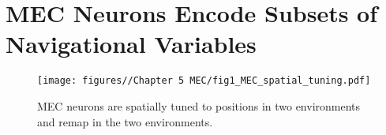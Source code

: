 \chapter{MEC Neurons Encode Subsets of Navigational Variables}
\label{chapterlabel5}

\begin{figure}
    \centering
    \texttt{[image: figures//Chapter 5 MEC/fig1\_MEC\_spatial\_tuning.pdf]}
    \caption{MEC neurons are spatially tuned to positions in two environments and remap in the two environments.}
    \label{fig:MEC remapping}
\end{figure}


